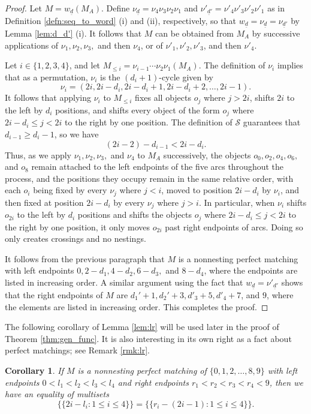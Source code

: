 \documentclass[10pt,a4paper]{amsart}
\newtheorem{cor}[theorem]{Corollary}
\numberwithin{equation}{section}
\newcommand{\mset}[1]{\{\!\{#1\}\!\}}
\newcommand{\seqd}{\underline{d}}
\newcommand{\cals}{\mathcal{S}}
\begin{document}
\begin{proof}
  Let $M=w_{\seqd}(M_A)$. Define $\nu_{\seqd}=\nu_4\nu_3\nu_2\nu_1$ and
  $\nu'_{\seqd'}=\nu'_4\nu'_3\nu'_2\nu'_1$ as in Definition
  \ref{defn:seq_to_word} (i) and (ii), respectively, so that
  $w_{\seqd}=\nu_{\seqd}=\nu_{\seqd'}$ by Lemma \ref{lem:d_d'} (i). It follows
  that $M$ can be obtained from $M_A$ by successive applications of $\nu_1,
  \nu_2, \nu_3,$ and then $\nu_4$, or of $\nu'_1, \nu'_2, \nu'_3$, and then
  $\nu'_4$.

Let $i\in \{1,2,3,4\}$, and let $M_{\le i}=\nu_{i-1}\cdots\nu_2\nu_1(M_A)$. The
definition of $\nu_i$ implies that as a permutation, $\nu_i$ is the $(d_i+1)$-cycle given by 
\[
  \nu_i=(2i,
2i-d_i, 2i-d_i+1, 2i-d_i+2, \dots, 2i-1).
\]
It follows that applying $\nu_i$ to $M_{\le i}$ fixes all
objects $o_j$ where $j>2i$, shifts $2i$ to the left by $d_i$ positions, and
shifts every object of the form $o_j$ where $2i-d_i\le j<2i$ to the right by one
position. The definition of $\cals$ guarantees that $d_{i-1}\ge d_i-1$, so we
have 
\[
  (2i-2)-d_{i-1}< 2i-d_i.
\]
Thus, as we apply $\nu_1, \nu_2,\nu_3,$ and $\nu_4$ to $M_A$
successively, the objects $o_{0}, o_{2}, o_4, o_6,$ and $o_8$ remain attached to
the left endpoints of the five arcs throughout the process, and the positions
they occupy remain in the same relative order, with each $o_i$ being fixed by
every $\nu_j$ where $j<i$, moved to position $2i-d_i$ by $\nu_i$, and then fixed
at position $2i-d_i$ by every $\nu_j$ where $j>i$. In particular, when $\nu_i$
shifts $o_{2i}$ to the left by $d_i$ positions and shifts the objects $o_j$
where $2i-d_{i}\le j<2i$ to the right by one position, it only moves $o_{2i}$
past right endpoints of arcs. Doing so only creates crossings and no nestings. 

It follows from the previous paragraph that $M$ is a nonnesting perfect matching
with left endpoints $0,2-d_1, 4-d_2, 6-d_3,$ and $8-d_4$, where the endpoints
are listed in increasing order. A similar argument using the fact that
$w_{\seqd}=\nu'_{\seqd'}$ shows that the right endpoints of $M$ are $d_1'+1,
d_2'+3,d'_3+5, d'_4+7$, and $9$, where the elements are listed in increasing
order. This completes the proof.
\end{proof}

The following corollary of Lemma \ref{lem:lr} will be used later in the proof of
Theorem \ref{thm:gen_func}. It is also interesting in its own right as a
fact about perfect matchings; see Remark \ref{rmk:lr}. 

\begin{cor}
\label{cor:lr}
If $M$ is a nonnesting perfect matching of $\{0,1,2,\dots,8,9\}$ with left endpoints $0<l_1<l_2<l_3<l_4$
  and right endpoints $r_1<r_2<r_3<r_4<9$, then we have an equality of multisets
  \begin{equation}
    \label{eq:lr}
    \mset{2i-l_i: 1\le i\le 4} = \mset{r_i-(2i-1): 1\le i\le 4}.
  \end{equation}
\end{cor}
\end{document}
